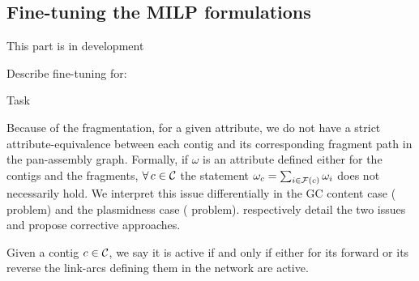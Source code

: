 \subsection{Fine-tuning the MILP formulations}

\begin{warningbox}
  This part is in development
\end{warningbox}

\begin{todobox}
  Describe fine-tuning for:
  \begin{CheckList}{Task}
  \end{CheckList}
\end{todobox}

Because of the fragmentation, for a given attribute, we do not have a strict attribute-equivalence between each contig and its corresponding fragment path in the pan-assembly graph.
Formally, if \(\omega{}\) is an attribute defined either for the contigs and the fragments, \(\forall c \in \Contigs{}\) the statement \(\omega_c = \sum_{i \in \mathcal{F}{}(c)} \omega_i\) does not necessarily hold.
We interpret this issue differentially in the GC content case (\MGC{} problem) and the plasmidness case (\MPS{} problem).
 respectively detail the two issues and propose corrective approaches.

Given a contig \(c \in \mathcal{C}{}\), we say it is active if and only if either for its forward or its reverse the link-arcs defining them in the network are active.



